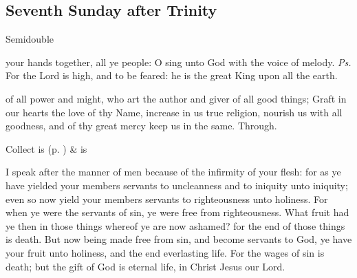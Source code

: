 \clearpage
\subsection{Seventh Sunday after Trinity}
\begin{inhead}
    {Semidouble}
\end{inhead}


\introit
{} your hands together, all ye people: O sing unto God with the voice of melody. \textit{Ps.} For the Lord is high, and to be feared: he is the great King upon all the earth.

\collect
{} of all power and might, who art the author and giver of all good things; Graft in our hearts the love of thy Name, increase in us true religion, nourish us with all goodness, and of thy great mercy keep us in the same. Through.

\begin{rubric}
     Collect is  (p. \pageref{SPSaints}) \&  is 
\end{rubric}

 I speak after the manner of men because of the infirmity of your flesh: for as ye have yielded your members servants to uncleanness and to iniquity unto iniquity; even so now yield your members servants to righteousness unto holiness. For when ye were the servants of sin, ye were free from righteousness. What fruit had ye then in those things whereof ye are now ashamed? for the end of those things is death. But now being made free from sin, and become servants to God, ye have your fruit unto holiness, and the end everlasting life. For the wages of sin is death; but the gift of God is eternal life, in Christ Jesus our Lord.


